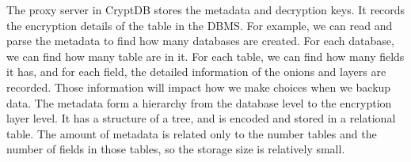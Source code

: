The proxy server in CryptDB stores the metadata and decryption keys. It records the encryption details of the table in the DBMS. For example, we can read and parse the metadata to find how many databases are created. For each database, we can find how many table are in it. For each table, we can find how many fields it has, and for each field, the detailed information of the onions and layers are recorded. Those information will impact how we make choices when we backup data. The metadata form a hierarchy from the database level to the encryption layer level. It has a structure of a tree, and is encoded and stored in a relational table. The amount of metadata is related only to the number tables and the number of fields in those tables, so the storage size is relatively small.












